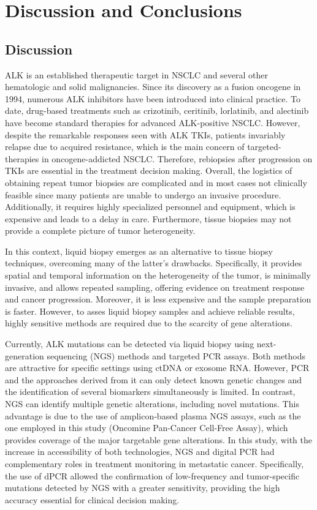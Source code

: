 \chapter{Discussion and Conclusions}

\section{Discussion}

ALK is an established therapeutic target in NSCLC and several other hematologic and solid malignancies. Since its discovery as a fusion oncogene in 1994, numerous ALK inhibitors have been introduced into clinical practice. To date, drug-based treatments such as crizotinib, ceritinib, lorlatinib, and alectinib have become standard therapies for advanced ALK-positive NSCLC. However, despite the remarkable responses seen with ALK TKIs, patients invariably relapse due to acquired resistance, which is the main concern of targeted-therapies in oncogene-addicted NSCLC. Therefore, rebiopsies after progression on TKIs are essential in the treatment decision making. Overall, the logistics of obtaining repeat tumor biopsies are complicated and in most cases not clinically feasible since many patients are unable to undergo an invasive procedure. Additionally, it requires highly specialized personnel and equipment, which is expensive and leads to a delay in care. Furthermore, tissue biopsies may not provide a complete picture of tumor heterogeneity.

In this context, liquid biopsy emerges as an alternative to tissue biopsy techniques, overcoming many of the latter's drawbacks. Specifically, it provides spatial and temporal information on the heterogeneity of the tumor, is minimally invasive, and allows repeated sampling, offering evidence on treatment response and cancer progression. Moreover, it is less expensive and the sample preparation is faster. However, to asses liquid biopsy samples and achieve reliable results, highly sensitive methods are required due to the scarcity of gene alterations.

Currently, ALK mutations can be detected via liquid biopsy using next-generation sequencing (NGS) methods and targeted PCR assays. Both methods are attractive for specific settings using ctDNA or exosome RNA. However, PCR and the approaches derived from it can only detect known genetic changes and the identification of several biomarkers simultaneously is limited. In contrast, NGS can identify multiple genetic alterations, including novel mutations. This advantage is due to the use of amplicon‐based plasma NGS assays, such as the one employed in this study (Oncomine\texttrademark{} Pan-Cancer Cell-Free Assay), which provides coverage of the major targetable gene alterations. In this study, with the increase in accessibility of both technologies, NGS and digital PCR had complementary roles in treatment monitoring in metastatic cancer. Specifically, the use of dPCR allowed the confirmation of low-frequency and tumor-specific mutations detected by NGS with a greater sensitivity, providing the high accuracy essential for clinical decision making.

